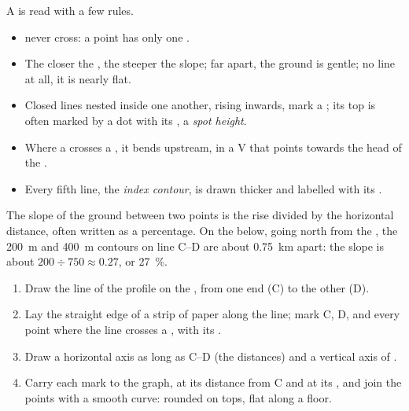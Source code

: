 A  is read with a few rules.
\begin{itemize}
  \item {} never cross: a point has only one .
  \item The closer the , the steeper the slope; far apart, the
        ground is gentle; no line at all, it is nearly flat.
  \item Closed lines nested inside one another, rising inwards, mark a ;
        its top is often marked by a dot with its , a \emph{spot
        height}.
  \item Where a  crosses a , it bends upstream, in a V
        that points towards the head of the .
  \item Every fifth line, the \emph{index contour}, is drawn thicker and
        labelled with its .
\end{itemize}

The slope of the ground between two points is the rise divided by the
horizontal distance, often written as a percentage. On the  below,
going north from the , the \qty{200}{m} and \qty{400}{m} contours on
line C--D are about \qty{0.75}{km} apart: the slope is about $200 \div 750
\approx 0.27$, or \qty{27}{\%}.

\begin{method}
\begin{enumerate}
  \item Draw the line of the profile on the , from one end (C) to the
        other (D).
  \item Lay the straight edge of a strip of paper along the line; mark C,
        D, and every point where the line crosses a , with
        its .
  \item Draw a horizontal axis as long as C--D (the distances) and a
        vertical axis of .
  \item Carry each mark to the graph, at its distance from C and at its
        , and join the points with a smooth curve: rounded on 
        tops, flat along a  floor.
\end{enumerate}
\end{method}

